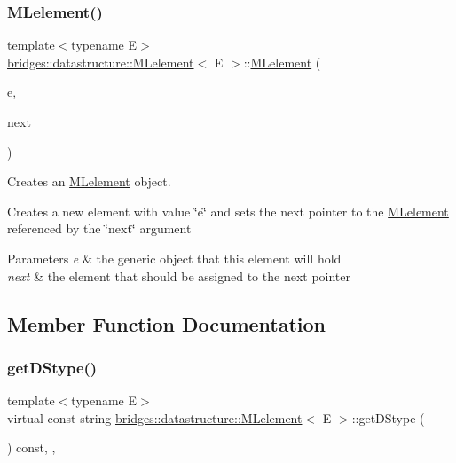 \subsubsection{\texorpdfstring{M\+Lelement()}{MLelement()}\hspace{0.1cm}{\footnotesize\ttfamily [3/3]}}
{\footnotesize\ttfamily template$<$typename E$>$ \\
\hyperlink{classbridges_1_1datastructure_1_1_m_lelement}{bridges\+::datastructure\+::\+M\+Lelement}$<$ E $>$\+::\hyperlink{classbridges_1_1datastructure_1_1_m_lelement}{M\+Lelement} (\begin{DoxyParamCaption}\item[{E}]{e,  }\item[{\hyperlink{classbridges_1_1datastructure_1_1_m_lelement}{M\+Lelement}$<$ E $>$ $\ast$}]{next }\end{DoxyParamCaption})\hspace{0.3cm}{\ttfamily [inline]}}



Creates an \hyperlink{classbridges_1_1datastructure_1_1_m_lelement}{M\+Lelement} object. 

Creates a new element with value \char`\"{}e\char`\"{} and sets the next pointer to the \hyperlink{classbridges_1_1datastructure_1_1_m_lelement}{M\+Lelement} referenced by the \char`\"{}next\char`\"{} argument


\begin{DoxyParams}{Parameters}
{\em e} & the generic object that this element will hold \\
\hline
{\em next} & the element that should be assigned to the next pointer \\
\hline
\end{DoxyParams}


\subsection{Member Function Documentation}
\mbox{\label{classbridges_1_1datastructure_1_1_m_lelement_a735c3cb43648b4d4e7d3316cdc1a1952}} 
\subsubsection{\texorpdfstring{get\+D\+Stype()}{getDStype()}}
{\footnotesize\ttfamily template$<$typename E$>$ \\
virtual const string \hyperlink{classbridges_1_1datastructure_1_1_m_lelement}{bridges\+::datastructure\+::\+M\+Lelement}$<$ E $>$\+::get\+D\+Stype (\begin{DoxyParamCaption}{ }\end{DoxyParamCaption}) const\hspace{0.3cm}{\ttfamily [inline]}, {\ttfamily [override]}, {\ttfamily [virtual]}}



